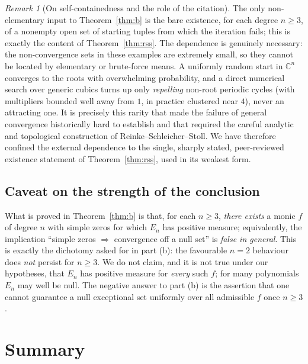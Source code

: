 \documentclass{amsart}
\theoremstyle{definition}
\theoremstyle{remark}
\newtheorem{remark}{Remark}
\newcommand{\C}{\mathbb{C}}
\begin{document}
\begin{remark}[On self-containedness and the role of the citation]
The only non-elementary input to Theorem~\ref{thm:b} is the bare existence, for each degree
$n\ge3$, of a nonempty open set of starting tuples from which the iteration fails; this is
exactly the content of Theorem~\ref{thm:rss}. The dependence is genuinely necessary: the
non-convergence sets in these examples are extremely small, so they cannot be located by
elementary or brute-force means. A uniformly random start in $\C^n$ converges to the roots
with overwhelming probability, and a direct numerical search over generic cubics turns up only
\emph{repelling} non-root periodic cycles (with multipliers bounded well away from $1$, in
practice clustered near $4$), never an attracting one. It is precisely this rarity that made
the failure of general convergence historically hard to establish and that required the
careful analytic and topological construction of Reinke--Schleicher--Stoll. We have therefore
confined the external dependence to the single, sharply stated, peer-reviewed existence
statement of Theorem~\ref{thm:rss}, used in its weakest form.
\end{remark}


\subsection{Caveat on the strength of the conclusion}

What is proved in Theorem~\ref{thm:b} is that, for each $n\ge3$, \emph{there exists} a monic
$f$ of degree $n$ with simple zeros for which $E_n$ has positive measure; equivalently, the
implication ``simple zeros $\Rightarrow$ convergence off a null set'' is \emph{false in
general}. This is exactly the dichotomy asked for in part (b): the favourable $n=2$ behaviour
does \emph{not} persist for $n\ge3$. We do not claim, and it is not true under our hypotheses,
that $E_n$ has positive measure for \emph{every} such $f$; for many polynomials $E_n$ may well
be null. The negative answer to part (b) is the assertion that one cannot guarantee a null
exceptional set uniformly over all admissible $f$ once $n\ge3$.

\section{Summary}
\end{document}
